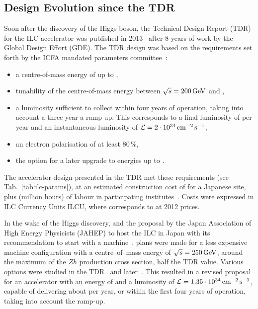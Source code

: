 \subsection{Design Evolution since the TDR}
\label{sec:design_evo}

Soon  after the discovery of the Higgs boson, the Technical Design Report (TDR) for the ILC accelerator was published in 2013~\cite{Adolphsen:2013jya,Adolphsen:2013kya} after 8 years of work by the Global Design Effort (GDE).
The TDR design was based on the requirements set forth by the ICFA mandated parameters committee~\cite{Heuer:2006}:
\begin{itemize}
\item a centre-of-mass energy of up to ,
\item tunability of the centre-of-mass energy between $\sqrt{s} = 200\,{\mathrm{GeV}}$
 and ,
\item  a luminosity sufficient to collect  within four years of operation, taking into account a three-year a ramp up.  This corresponds to a final luminosity of  per year and an instantaneous luminosity of ${\mathcal{L}} = 2 \cdot 10^{34}\,{\mathrm{cm^{-2}\,s^{-1}}}$,
\item an electron polarisation of at least $80\,\%$,
\item  the option for a later upgrade to energies  up to .
\end{itemize}

The accelerator design presented in the TDR met these requirements (see Tab.~\ref{tab:ilc-params}), at an estimated construction cost of  for a Japanese site, plus  (million hours) of labour in participating institutes~\cite[Sec. 15.8.4]{Adolphsen:2013kya}. 
Costs were expressed in ILC Currency Units ILCU, where  corresponds to  at 2012 prices.

In the wake of the Higgs discovery, and the proposal by the Japan Association of High Energy Physicists (JAHEP) to host the ILC in Japan\cite{JAHEP:2012a} with its recommendation to start with a  machine~\cite{JAHEP:2012b}, plans were made for a less expensive machine configuration with a centre--of--mass energy of $\sqrt{s} = 250\,{\mathrm{GeV}}$, around the maximum of the $Zh$ production cross section, half the TDR value.
Various options were studied in the TDR~\cite[Sect. 12.5]{Adolphsen:2013kya} and later~\cite{Dugan:2014}.
This resulted in a revised proposal~\cite{Evans:2017rvt} for an accelerator with an energy of  and a luminosity of ${\mathcal{L}} = 1.35 \cdot 10^{34}\,{\mathrm{cm^{-2}\,s^{-1}}}$, capable of delivering about  per year, or  within the first four years of operation, taking into account the ramp-up.

